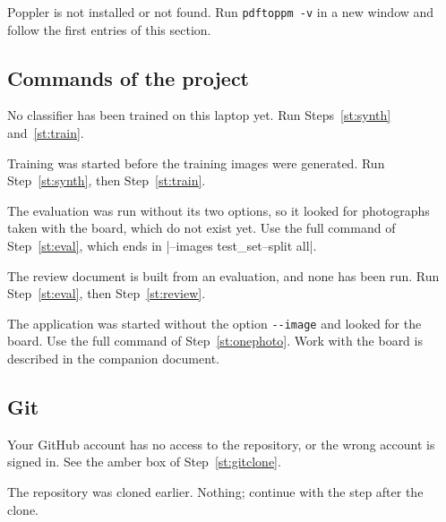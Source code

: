 \cause Poppler is not installed or not found.
\remedy Run \texttt{pdftoppm -v} in a new window and follow the first entries of this section.

\subsection{Commands of the project}

\cause No classifier has been trained on this laptop yet.
\remedy Run Steps~\ref{st:synth} and~\ref{st:train}.

\cause Training was started before the training images were generated.
\remedy Run Step~\ref{st:synth}, then Step~\ref{st:train}.

\cause The evaluation was run without its two options, so it looked for photographs taken with the
board, which do not exist yet.
\remedy Use the full command of Step~\ref{st:eval}, which ends in
\code|--images test_set\synthetic --split all|.

\cause The review document is built from an evaluation, and none has been run.
\remedy Run Step~\ref{st:eval}, then Step~\ref{st:review}.

\cause The application was started without the option \texttt{-{}-image} and looked for the board.
\remedy Use the full command of Step~\ref{st:onephoto}. Work with the board is described in the
companion document.

\subsection{Git}

\cause Your GitHub account has no access to the repository, or the wrong account is signed in.
\remedy See the amber box of Step~\ref{st:gitclone}.

\cause The repository was cloned earlier.
\remedy Nothing; continue with the step after the clone.

